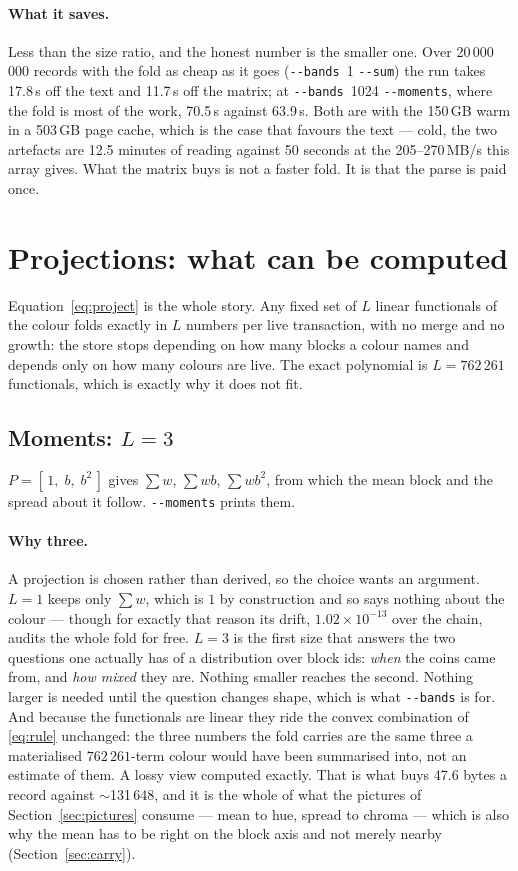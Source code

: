 \documentclass[11pt,a4paper]{article}
\newcommand{\flag}[1]{\texttt{-{}-#1}}
\begin{document}
\paragraph{What it saves.} Less than the size ratio, and the honest number is the
smaller one. Over 20\,000\,000 records with the fold as cheap as it goes
(\flag{bands}~1 \flag{sum}) the run takes 17.8\,s off the text and 11.7\,s off the
matrix; at \flag{bands}~1024 \flag{moments}, where the fold is most of the work,
70.5\,s against 63.9\,s. Both are with the 150\,GB warm in a 503\,GB page cache,
which is the case that favours the text --- cold, the two artefacts are 12.5
minutes of reading against 50 seconds at the 205--270\,MB/s this array gives.
What the matrix buys is not a faster fold. It is that the parse is paid once.

\section{Projections: what can be computed}
\label{sec:projections}

Equation~\eqref{eq:project} is the whole story. Any fixed set of $L$ linear
functionals of the colour folds exactly in $L$ numbers per live transaction,
with no merge and no growth: the store stops depending on how many blocks a
colour names and depends only on how many colours are live. The exact polynomial
is $L = 762\,261$ functionals, which is exactly why it does not fit.

\subsection{Moments: $L=3$}

$P = [\,1,\; b,\; b^2\,]$ gives $\sum w$, $\sum wb$, $\sum wb^2$, from which the
mean block and the spread about it follow. \flag{moments} prints them.

\paragraph{Why three.} A projection is chosen rather than derived, so the choice
wants an argument. $L=1$ keeps only $\sum w$, which is $1$ by construction and so
says nothing about the colour --- though for exactly that reason its drift,
$1.02\times10^{-13}$ over the chain, audits the whole fold for free. $L=3$ is the
first size that answers the two questions one actually has of a distribution over
block ids: \emph{when} the coins came from, and \emph{how mixed} they are.
Nothing smaller reaches the second. Nothing larger is needed until the question
changes shape, which is what \flag{bands} is for. And because the functionals are
linear they ride the convex combination of \eqref{eq:rule} unchanged: the three
numbers the fold carries are the same three a materialised $762\,261$-term colour
would have been summarised into, not an estimate of them. A lossy view computed
exactly. That is what buys 47.6 bytes a record against $\sim$131\,648, and it is
the whole of what the pictures of Section~\ref{sec:pictures} consume --- mean to
hue, spread to chroma --- which is also why the mean has to be right on the block
axis and not merely nearby (Section~\ref{sec:carry}).
\end{document}
